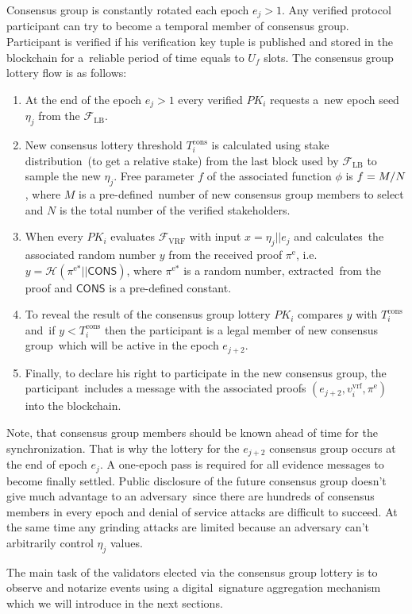 Consensus group is constantly rotated each epoch ${e_j \gt 1}$.
Any verified protocol participant can try to become a temporal member of consensus group.
Participant is verified if his verification key tuple is published and stored in the blockchain for a\
reliable period of time equals to $U_f$ slots.
The consensus group lottery flow is as follows:
\begin{enumerate}
    \item At the end of the epoch ${e_j \gt 1}$ every verified $PK_i$ requests a\
    new epoch seed $\eta_j$ from the ${\mathcal{F}}_{\text{LB}}$.
    \item New consensus lottery threshold $T_i^{\text{cons}}$ is calculated using stake distribution\
    (to get a relative stake) from the last block used by ${\mathcal{F}}_{\text{LB}}$ to sample the new $\eta_j$.
    Free parameter $f$ of the associated function $\phi$ is ${f = M /\/ N}$, where $M$ is a pre-defined\
    number of new consensus group members to select and $N$ is the total number of the verified stakeholders.
    \item When every $PK_i$ evaluates ${\mathcal{F}}_{\text{VRF}}$ with input $x = \eta_j || e_j $ and calculates\
    the associated random number $y$ from the received proof $\pi^{\text{e}}$, i.e.\
    ${y = \mathcal{H}(\pi^{\text{e}*}||\textsf{CONS})}$, where $\pi^{\text{e}*}$ is a random number, extracted\
    from the proof and $\textsf{CONS}$ is a pre-defined constant.
    \item To reveal the result of the consensus group lottery $PK_i$ compares $y$ with $T_i^{\text{cons}}$ and\
    if ${y < T_i^{\text{cons}}}$ then the participant is a legal member of new consensus group\
    which will be active in the epoch $e_{j+2}$.
    \item Finally, to declare his right to participate in the new consensus group, the participant\
    includes a message with the associated proofs $(e_{j+2}, v^{\text{vrf}}_i, \pi^{\text{e}})$ into the blockchain.
\end{enumerate}
Note, that consensus group members should be known ahead of time for the synchronization.
That is why the lottery for the $e_{j + 2}$ consensus group occurs at the end of epoch $e_j$.
A one-epoch pass is required for all evidence messages to become finally settled.
Public disclosure of the future consensus group doesn't give much advantage to an adversary\
since there are hundreds of consensus members in every epoch and denial of service attacks are difficult to succeed.
At the same time any grinding attacks are limited because an adversary can't arbitrarily control $\eta_j$ values.

The main task of the validators elected via the consensus group lottery is to observe and notarize events using a digital\
signature aggregation mechanism which we will introduce in the next sections.

